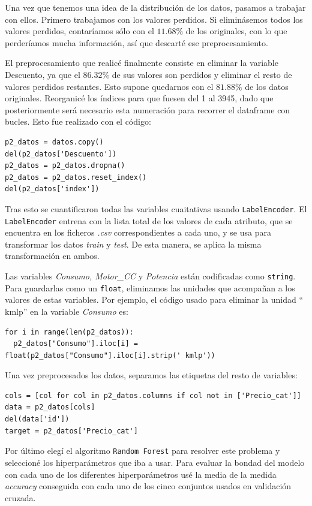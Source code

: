 \documentclass[a4]{article}
\begin{document}
Una vez que tenemos una idea de la distribución de los datos, pasamos a trabajar con ellos. Primero trabajamos con los valores perdidos. Si eliminásemos todos los valores perdidos, contaríamos sólo con el $11.68\%$ de los originales, con lo que perderíamos mucha información, así que descarté ese preprocesamiento.

El preprocesamiento que realicé finalmente consiste en eliminar la variable Descuento, ya que el $86.32\%$ de sus valores son perdidos y eliminar el resto de valores perdidos restantes. Esto supone quedarnos con el $81.88\%$ de los datos originales. Reorganicé los índices para que fuesen del 1 al 3945, dado que posteriormente será necesario esta numeración para recorrer el dataframe con bucles. Esto fue realizado con el código:

\begin{lstlisting}
p2_datos = datos.copy()
del(p2_datos['Descuento'])
p2_datos = p2_datos.dropna()
p2_datos = p2_datos.reset_index()
del(p2_datos['index'])
\end{lstlisting}

Tras esto se cuantificaron todas las variables cuaitativas usando \texttt{LabelEncoder}. El \texttt{LabelEncoder} entrena con la lista total de los valores de cada atributo, que se encuentra en los ficheros \textit{.csv} correspondientes a cada uno, y se usa para transformar los datos \textit{train} y \textit{test}. De esta manera, se aplica la misma transformación en ambos.

Las variables \textit{Consumo, Motor\_CC} y \textit{Potencia} están codificadas como \texttt{string}. Para guardarlas como un \texttt{float}, eliminamos las unidades que acompañan a los valores de estas variables. Por ejemplo, el código usado para eliminar la unidad `` kmlp'' en la variable \textit{Consumo} es:

\begin{lstlisting}
for i in range(len(p2_datos)):
  p2_datos["Consumo"].iloc[i] = float(p2_datos["Consumo"].iloc[i].strip(' kmlp'))
\end{lstlisting}

Una vez preprocesados los datos, separamos las etiquetas del resto de variables:

\begin{lstlisting}
cols = [col for col in p2_datos.columns if col not in ['Precio_cat']]
data = p2_datos[cols]
del(data['id'])
target = p2_datos['Precio_cat']
\end{lstlisting}

Por último elegí el algoritmo \texttt{Random Forest} para resolver este problema y seleccioné los hiperparámetros que iba a usar. Para evaluar la bondad del modelo con cada uno de los diferentes hiperparámetros usé la media de la medida \textit{accuracy} conseguida con cada uno de los cinco conjuntos usados en validación cruzada.
\end{document}
